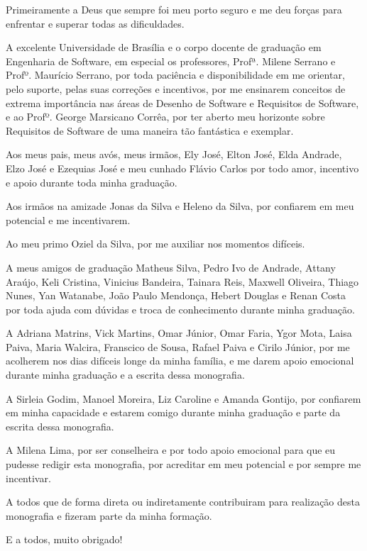 \begin{agradecimentos}

	Primeiramente a Deus que sempre foi meu porto seguro e me deu forças para enfrentar e superar todas as dificuldades.
	 
	A excelente Universidade de Brasília e o corpo docente de graduação em Engenharia de Software, em especial os professores, Profª. Milene Serrano e Profº. Maurício Serrano, por toda paciência e disponibilidade em me orientar, pelo suporte, pelas suas correções e incentivos, por me ensinarem conceitos de extrema importância nas áreas de Desenho de Software e Requisitos de Software, e ao Profº. George Marsicano Corrêa, por ter aberto meu horizonte sobre Requisitos de Software de uma maneira tão fantástica e exemplar.
	
	Aos meus pais, meus avós, meus irmãos, Ely José, Elton José, Elda Andrade, Elzo José e Ezequias José e meu cunhado Flávio Carlos por todo amor, incentivo e apoio durante toda minha graduação. 
	
	Aos irmãos na amizade Jonas da Silva e Heleno da Silva, por confiarem em meu potencial e me incentivarem. 
	
	Ao meu primo Oziel da Silva, por me auxiliar nos momentos difíceis. 
	
	A meus amigos de graduação Matheus Silva, Pedro Ivo de Andrade, Attany Araújo, Keli Cristina, Vinicius Bandeira, Tainara Reis, Maxwell Oliveira, Thiago Nunes, Yan Watanabe, João Paulo Mendonça, Hebert Douglas e Renan Costa por toda ajuda com dúvidas e troca de conhecimento durante minha graduação. 
	
	A Adriana Matrins, Vick Martins, Omar Júnior, Omar Faria, Ygor Mota, Laisa Paiva, Maria Walcira, Franscico de Sousa, Rafael Paiva e Cirilo Júnior, por me acolherem nos dias difíceis longe da minha família,  e me darem apoio emocional durante minha graduação e a escrita dessa monografia. 
	
	A Sirleia Godim, Manoel Moreira, Liz Caroline e Amanda Gontijo, por confiarem em minha capacidade e estarem comigo durante minha graduação e parte da escrita dessa monografia. 
	
	A Milena Lima, por ser conselheira e por todo apoio emocional para que eu pudesse redigir esta monografia, por acreditar em meu potencial e por sempre me incentivar.
	
	A todos que de forma direta ou indiretamente contribuiram para realização desta monografia e fizeram parte da minha formação. 
	
	E a todos, muito obrigado!  
	
\end{agradecimentos}
